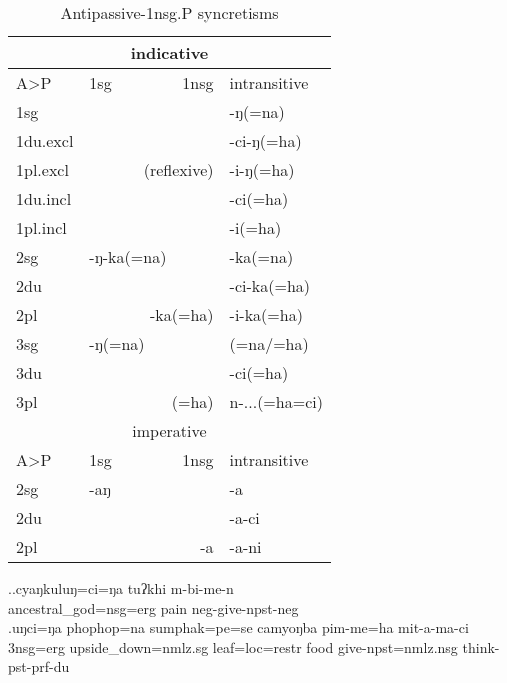 \noindent
\begin{table}[htp!]
\begin{center}
\begin{tabular}{l|l|l|l}
 \hline
 \multicolumn{4}{c}{{\sc indicative}}\\
		\hline
	A>P	& 	{\sc 1sg}  &	 {\sc 1nsg}  & {\sc intransitive} \\
 \hline
{\sc 1sg} 	&\multicolumn{2}{r|}{}&-ŋ(=na)\\
 \cline{1-1} \cline{4-4}			
{\sc 1du.excl}  	& \multicolumn{2}{r|}{}&-ci-ŋ(=ha)\\
 \cline{1-1} \cline{4-4}  	
{\sc 1pl.excl}	 	&\multicolumn{2}{r|}{(reflexive)}&-i-ŋ(=ha)\\
 \cline{1-1} \cline{4-4}			
{\sc 1du.incl}  	& \multicolumn{2}{r|}{}&-ci(=ha)\\
 \cline{1-1} \cline{4-4}			
{\sc 1pl.incl}  	&	\multicolumn{2}{r|}{}&-i(=ha)\\
 \hline			
{\sc 2sg}  	&	 -ŋ-ka(=na)&\cellcolor[gray]{.8}&\cellcolor[gray]{.8}-ka(=na)\\
 \cline{1-2}  
{\sc 2du}  	&  \multicolumn{2}{r|}{\cellcolor[gray]{.8}} &-ci-ka(=ha)\\
 \cline{1-1} 	
{\sc 2pl}	 	&  \multicolumn{2}{r|}{\cellcolor[gray]{.8}-ka(=ha)} &-i-ka(=ha)\\
 \hline			
{\sc 3sg} 	 		& -ŋ(=na)&\cellcolor[gray]{.8}&\cellcolor[gray]{.8}(=na/=ha)\\
  \cline{1-2}  			
{\sc 3du}	 	&   \multicolumn{2}{r|}{\cellcolor[gray]{.8}} &-ci(=ha)\\
  \cline{1-2}  
{\sc 3pl}	 	&  \multicolumn{2}{r|}{\cellcolor[gray]{.8}(=ha)} &n-...(=ha=ci)\\
\hline 
 \multicolumn{4}{c}{{\sc imperative}} \\
\hline 
	A>P	& 	{\sc 1sg}  &	 {\sc 1nsg}  & {\sc intransitive} \\
\hline
 {\sc 2sg} &-aŋ& \cellcolor[gray]{.8}&\cellcolor[gray]{.8}-a\\
 \cline{1-2}  
 {\sc 2du} & \multicolumn{2}{r|}{\cellcolor[gray]{.8}} &-a-ci\\
  \cline{1-1} 	
 {\sc 2pl}&\multicolumn{2}{r|}{\cellcolor[gray]{.8}-a}& -a-ni\\
\hline
\end{tabular}
\end{center}
\caption{Antipassive-{\sc 1nsg.P} syncretisms}\label{antip-tab}
\end{table}


\ex.\ag.cyaŋkuluŋ=ci=ŋa     tuʔkhi m-bi-me-n\\
ancestral\_god{\sc =nsg=erg} pain {\sc neg-}give{\sc [3A;1.P]-npst-neg}\\
\bg.uŋci=ŋa   phophop=na  sumphak=pe=se   camyoŋba pim-me=ha mit-a-ma-ci\\
{\sc 3nsg=erg} upside\_down{\sc =nmlz.sg} leaf{\sc =loc=restr} food  give{\sc [3A;1.P]-npst=nmlz.nsg} think{\sc -pst-prf-du}\\


